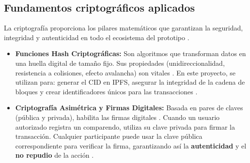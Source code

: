 \subsection{Fundamentos criptográficos aplicados}
La criptografía proporciona los pilares matemáticos que garantizan la seguridad, integridad y autenticidad en todo el ecosistema del prototipo \parencite{katz2020introduction}.
\begin{itemize}
    \item \textbf{Funciones Hash Criptográficas:} Son algoritmos que transforman datos en una huella digital de tamaño fijo. Sus propiedades (unidireccionalidad, resistencia a colisiones, efecto avalancha) son vitales \parencite{schneier2007applied, menezes1996handbook}. En este proyecto, se utilizan para: generar el CID en IPFS, asegurar la integridad de la cadena de bloques y crear identificadores únicos para las transacciones \parencite{benet2014ipfs, nakamoto2008bitcoin}.
    \item \textbf{Criptografía Asimétrica y Firmas Digitales:} Basada en pares de claves (pública y privada), habilita las firmas digitales \parencite{diffie2022new, rivest1978method}. Cuando un usuario autorizado registra un comparendo, utiliza su clave privada para firmar la transacción. Cualquier participante puede usar la clave pública correspondiente para verificar la firma, garantizando así la \textbf{autenticidad} y el \textbf{no repudio} de la acción \parencite{katz2020introduction}.
\end{itemize}